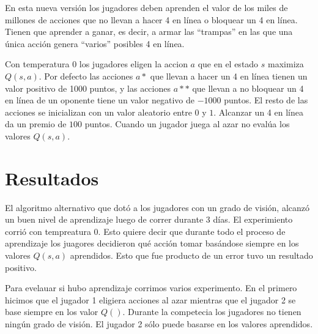 \documentclass[11pt, spanish]{article}
\begin{document}
\par En esta nueva versi\'on los jugadores deben aprenden el valor de los miles de millones de acciones que no llevan a hacer 4 en l\'inea o bloquear un 4 en l\'inea. Tienen que aprender a ganar, es decir, a armar las ``trampas'' en las que una \'unica acci\'on genera ``varios'' posibles 4 en línea. 

\par Con temperatura 0 los jugadores eligen la accion $a$ que en el estado $s$ maximiza $Q(s,a)$. Por defecto las acciones $a*$ que llevan a hacer un 4 en l\'inea tienen un valor positivo de 1000 puntos, y las acciones $a**$ que llevan a no bloquear un 4 en l\'inea de un oponente tiene un valor negativo de $-1000$ puntos. El resto de las acciones se inicializan con un valor aleatorio entre $0$ y $1$. Alcanzar un 4 en l\'inea da un premio de $100$ puntos. Cuando un jugador juega al azar no eval\'ua los valores $Q(s,a)$. 


\section{Resultados}

\par El algoritmo alternativo que dot\'o a los jugadores con un grado de visi\'on, alcanz\'o un buen nivel de aprendizaje luego de correr durante 3 d\'ias. El experimiento corri\'o con tempreatura 0. Esto quiere decir que durante todo el proceso de aprendizaje los juagores decidieron qu\'e acci\'on tomar bas\'andose siempre en los valores $Q(s,a)$ aprendidos. Esto que fue producto de un error tuvo un resultado positivo. 

\par Para evelauar si hubo aprendizaje corrimos varios experimento. En el primero hicimos que el jugador 1 eligiera acciones al azar mientras que el jugador 2 se base siempre en los valor $Q()$. Durante la competecia los jugadores no tienen ning\'un grado de visi\'on. El jugador 2 s\'olo puede basarse en los valores aprendidos. 
\end{document}
